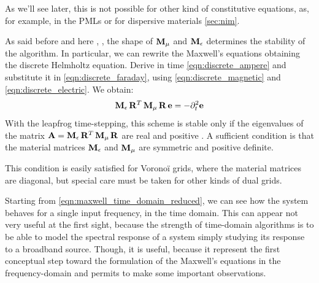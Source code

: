 As we'll see later, this is not possible for other kind of
constitutive equations, as, for example, in the PMLs or for dispersive
materials \ref{sec:nim}.



As said before and here \cite{schuhmann_whitney},
\cite{schuhmann_stability}, the shape of $\mathbf{M}_\mu$ and
$\mathbf{M}_\epsilon$ determines the stability of the algorithm. In
particular, we can rewrite the Maxwell's equations obtaining the
discrete Helmholtz equation. Derive in time
\eqref{eqn:discrete_ampere} and substitute it in
\eqref{eqn:discrete_faraday}, using \eqref{eqn:discrete_magnetic} and
\eqref{eqn:discrete_electric}. We obtain:
\begin{equation} \label{eqn:discrete_helmholtz}
  {{\mathbf{M}_\epsilon\,{{\mathbf{R}}^T\,{\mathbf{M}_\mu\,\mathbf{R}}}}\,\mathbf{e}}
  = -\partial_t^2 \mathbf{e}
\end{equation}
With the leapfrog time-stepping, this scheme is stable only if the
eigenvalues of the matrix $\mathbf{A} =
{\mathbf{M}_\epsilon\,{{\mathbf{R}}^T\,{\mathbf{M}_\mu\,\mathbf{R}}}}$
are real and positive \cite{liu_fourier}. A sufficient condition is
that the material matrices $\mathbf{M}_\epsilon$ and $\mathbf{M}_\mu$
are symmetric and positive definite.

This condition is easily satisfied for Vorono\"i grids, where the
material matrices are diagonal, but special care must be taken for
other kinds of dual grids.

Starting from \eqref{eqn:maxwell_time_domain_reduced}, we can see how
the system behaves for a single input frequency, in the time
domain. This can appear not very useful at the first sight, because
the strength of time-domain algorithms is to be able to model the
spectral response of a system simply studying its response to a
broadband source. Though, it is useful, because it represent the first
conceptual step toward the formulation of the Maxwell's equations in
the frequency-domain and permits to make some important observations.

